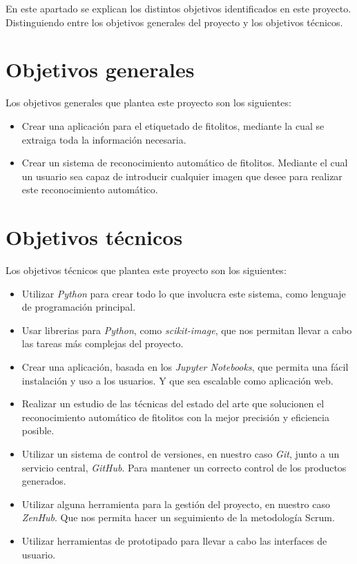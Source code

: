 

En este apartado se explican los distintos objetivos identificados en este proyecto. Distinguiendo entre los objetivos generales del proyecto y los objetivos técnicos.

\section{Objetivos generales}

Los objetivos generales que plantea este proyecto son los siguientes:

\begin{itemize}
	\item Crear una aplicación para el etiquetado de fitolitos, mediante la cual se extraiga toda la información necesaria.
	\item Crear un sistema de reconocimiento automático de fitolitos. Mediante el cual un usuario sea capaz de introducir cualquier imagen que desee para realizar este reconocimiento automático.
\end{itemize}

\section{Objetivos técnicos}

Los objetivos técnicos que plantea este proyecto son los siguientes:

\begin{itemize}
	\item Utilizar \textit{Python} para crear todo lo que involucra este sistema, como lenguaje de programación principal.
	\item Usar librerias para \textit{Python}, como \textit{scikit-image}\cite{scikit-image}, que nos permitan llevar a cabo las tareas más complejas del proyecto.
	\item Crear una aplicación, basada en los \textit{Jupyter Notebooks}, que permita una fácil instalación y uso a los usuarios. Y que sea escalable como aplicación web.
	\item Realizar un estudio de las técnicas del estado del arte que solucionen el reconocimiento automático de fitolitos con la mejor precisión y eficiencia posible.
	\item Utilizar un sistema de control de versiones, en nuestro caso \textit{Git}, junto a un servicio central, \textit{GitHub}. Para mantener un correcto control de los productos generados.
	\item Utilizar alguna herramienta para la gestión del proyecto, en nuestro caso \textit{ZenHub}. Que nos permita hacer un seguimiento de la metodología Scrum.
	\item Utilizar herramientas de prototipado para llevar a cabo las interfaces de usuario.
\end{itemize}
